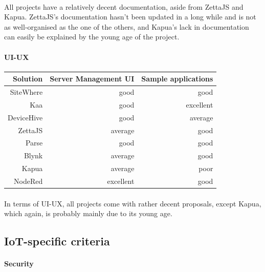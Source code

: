 \documentclass{article}
\begin{document}
\paragraph{} All projects have a relatively decent documentation, aside from ZettaJS and Kapua. ZettaJS's documentation hasn't been updated in a long while and is not as well-organised as the one of the others, and Kapua's lack in documentation can easily be explained by the young age of the project.

\paragraph{UI-UX}

\begin{center}
\begin{tabular}{r|r|r}
Solution & Server Management UI	& Sample applications \\ \hline
SiteWhere & \cellcolor{blue!10}good & \cellcolor{blue!10}good \\
Kaa & \cellcolor{blue!10}good & \cellcolor{green!25}excellent \\
DeviceHive & \cellcolor{blue!10}good & \cellcolor{yellow!25}average \\
ZettaJS & \cellcolor{yellow!25}average & \cellcolor{blue!10}good \\
Parse & \cellcolor{blue!10}good & \cellcolor{blue!10}good \\
Blynk & \cellcolor{yellow!25}average & \cellcolor{blue!10}good \\
Kapua & \cellcolor{yellow!25}average & \cellcolor{orange!25}poor \\
NodeRed & \cellcolor{green!25}excellent & \cellcolor{blue!10}good \\
\end{tabular}
\end{center}

\paragraph{} In terms of UI-UX, all projects come with rather decent proposals, except Kapua, which again, is probably mainly due to its young age.

\newpage

\subsection{IoT-specific criteria}

\paragraph{Security}
\end{document}
